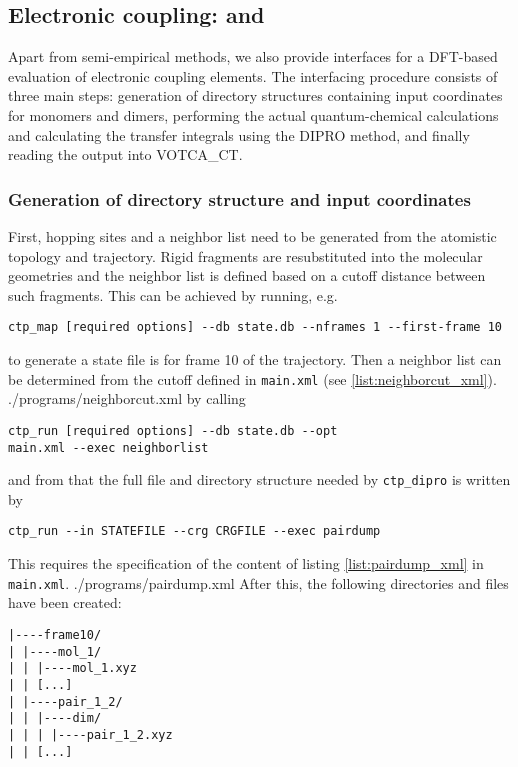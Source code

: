 \subsection{Electronic coupling: \gaussian and \turbomole}

Apart from semi-empirical methods, we also provide interfaces for a DFT-based evaluation of electronic coupling elements. The interfacing procedure consists of three main steps: generation of directory structures containing input coordinates for monomers and dimers, performing the actual quantum-chemical calculations and calculating the transfer integrals using the DIPRO method, and finally reading the output into VOTCA\_CT.
\subsubsection{Generation of directory structure and input coordinates}
First, hopping sites and a neighbor list need to be generated from the atomistic topology and trajectory. Rigid fragments are resubstituted into the molecular geometries and the neighbor list is defined based on a cutoff distance between such fragments. This can be achieved by running, e.g.  
\begin{verbatim}
ctp_map [required options] --db state.db --nframes 1 --first-frame 10
\end{verbatim}
to generate a state file is for frame 10 of the trajectory. Then a neighbor list can be determined from the cutoff defined in {\tt main.xml} (see \ref{list:neighborcut_xml}).
 {./programs/neighborcut.xml}
by calling
\begin{verbatim}
ctp_run [required options] --db state.db --opt
main.xml --exec neighborlist
\end{verbatim}
and from that the full file and directory structure needed by {\tt ctp\_dipro} is written by 
\begin{verbatim}
ctp_run --in STATEFILE --crg CRGFILE --exec pairdump
\end{verbatim}
This requires the specification of the content of listing \ref{list:pairdump_xml} in {\tt main.xml}.
 {./programs/pairdump.xml}
After this, the following directories and files have been created:
\begin{verbatim}
|----frame10/
| |----mol_1/
| | |----mol_1.xyz
| | [...]
| |----pair_1_2/
| | |----dim/
| | | |----pair_1_2.xyz
| | [...]
\end{verbatim}

